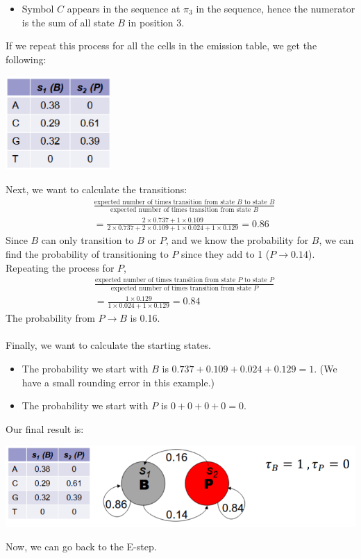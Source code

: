 \documentclass[10pt]{article}
\begin{document}
\begin{itemize}
	\item Symbol $C$ appears in the sequence at $\pi_3$ in the sequence, hence the numerator is the sum of all state $B$ in position 3.
\end{itemize}
If we repeat this process for all the cells in the emission table, we get the following:
\begin{center} 
	\includegraphics*[width=0.3\textwidth]{W9_32.png} 
\end{center}
Next, we want to calculate the transitions:
\begin{align*}
    &\frac{\text{expected number of times transition from state $B$ to state $B$}}{\text{expected number of times transition from state $B$}}\\
    &= \frac{2 \times 0.737 + 1 \times 0.109}{2 \times 0.737 + 2 \times 0.109 + 1 \times 0.024 + 1 \times 0.129} = 0.86
\end{align*}
Since $B$ can only transition to $B$ or $P$, and we know the probability for $B$, we can find the probability of transitioning to $P$ since they add to 1  ($P \rightarrow 0.14$).
Repeating the process for $P$,
\begin{align*}
    &\frac{\text{expected number of times transition from state $P$ to state $P$}}{\text{expected number of times transition from state $P$}}\\
    &= \frac{1 \times 0.129}{1 \times 0.024 + 1 \times 0.129} = 0.84
\end{align*}
The probability from $P \rightarrow B$ is 0.16.\\\\
Finally, we want to calculate the starting states.
\begin{itemize}
	\item The probability we start with $B$ is $0.737 + 0.109 + 0.024 + 0.129 = 1$.  (We have a small rounding error in this example.)
    \item The probability we start with $P$ is $0 + 0 + 0 + 0 = 0$.
\end{itemize}
Our final result is:
\begin{center} 
	\includegraphics*[width=\textwidth]{W9_33.png}
\end{center}
Now, we can go back to the E-step.
\end{document}
